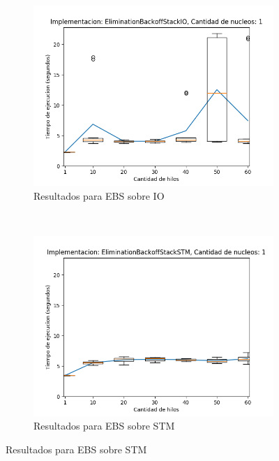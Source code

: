 \begin{appendices}
\begin{figure}[t]
    \centering
    \begin{subfigure}[b]{0.49\textwidth}
        \includegraphics[width=\textwidth]{images/numberOfThreadsDist/plots/expEBSIO-1}
        \caption{Resultados para EBS sobre IO}
        \label{subfig:numberOfThreadsDist-ebsio-1}
    \end{subfigure}
    ~
    \begin{subfigure}[b]{0.49\textwidth}
        \includegraphics[width=\textwidth]{images/numberOfThreadsDist/plots/expEBSSTM-1}
        \caption{Resultados para EBS sobre STM}
        \label{subfig:numberOfThreadsDist-ebsstm-1}
    \end{subfigure}

\end{figure}
\end{appendices}
